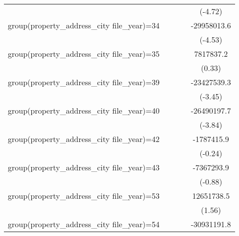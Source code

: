 {\begin{tabular}{l*{4}{c}}
                    &                     &                     &                     &     (-4.72)         \\
\addlinespace
group(property\_address\_city file\_year)=34&                     &                     &                     & -29958013.6\sym{***}\\
                    &                     &                     &                     &     (-4.53)         \\
\addlinespace
group(property\_address\_city file\_year)=35&                     &                     &                     &   7817837.2         \\
                    &                     &                     &                     &      (0.33)         \\
\addlinespace
group(property\_address\_city file\_year)=39&                     &                     &                     & -23427539.3\sym{***}\\
                    &                     &                     &                     &     (-3.45)         \\
\addlinespace
group(property\_address\_city file\_year)=40&                     &                     &                     & -26490197.7\sym{***}\\
                    &                     &                     &                     &     (-3.84)         \\
\addlinespace
group(property\_address\_city file\_year)=42&                     &                     &                     &  -1787415.9         \\
                    &                     &                     &                     &     (-0.24)         \\
\addlinespace
group(property\_address\_city file\_year)=43&                     &                     &                     &  -7367293.9         \\
                    &                     &                     &                     &     (-0.88)         \\
\addlinespace
group(property\_address\_city file\_year)=53&                     &                     &                     &  12651738.5         \\
                    &                     &                     &                     &      (1.56)         \\
\addlinespace
group(property\_address\_city file\_year)=54&                     &                     &                     & -30931191.8\sym{***}\\

\end{tabular}}
